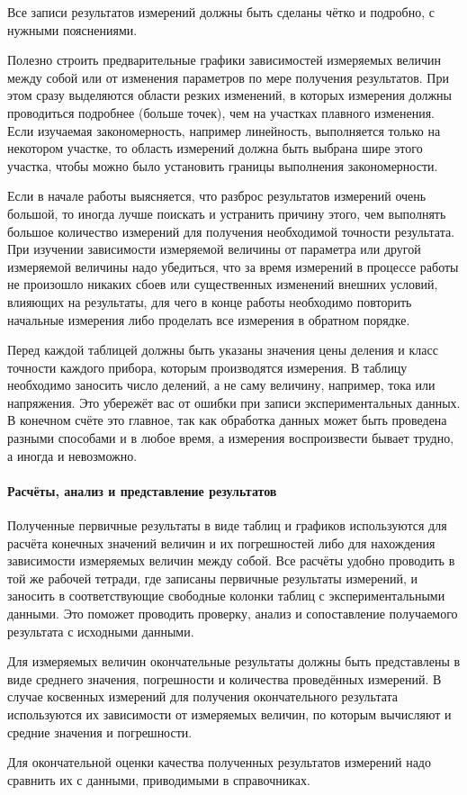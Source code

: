 \documentclass[10pt]{article}
\begin{document}
\begin{lyxgreyedout}
Все записи результатов измерений должны быть сделаны чётко и подробно,
с нужными пояснениями.

Полезно строить предварительные графики зависимостей измеряемых величин
между собой или от изменения параметров по мере получения результатов.
При этом сразу выделяются области резких изменений, в которых измерения
должны проводиться подробнее (больше точек), чем на участках плавного
изменения. Если изучаемая закономерность, например линейность, выполняется
только на некотором участке, то область измерений должна быть выбрана
шире этого участка, чтобы можно было установить границы выполнения
закономерности.

Если в начале работы выясняется, что разброс результатов измерений
очень большой, то иногда лучше поискать и устранить причину этого,
чем выполнять большое количество измерений для получения необходимой
точности результата. При изучении зависимости измеряемой величины
от параметра или другой измеряемой величины надо убедиться, что за
время измерений в процессе работы не произошло никаких сбоев или существенных
изменений внешних условий, влияющих на результаты, для чего в конце
работы необходимо повторить начальные измерения либо проделать все
измерения в обратном порядке.

Перед каждой таблицей должны быть указаны значения цены деления и
класс точности каждого прибора, которым производятся измерения. В
таблицу необходимо заносить число делений, а не саму величину, например,
тока или напряжения. Это убережёт вас от ошибки при записи экспериментальных
данных. В конечном счёте это главное, так как обработка данных может
быть проведена разными способами и в любое время, а измерения воспроизвести
бывает трудно, а иногда и невозможно.%
\end{lyxgreyedout}


\paragraph{Расчёты, анализ и представление результатов}

\begin{lyxgreyedout}
Полученные первичные результаты в виде таблиц и графиков используются
для расчёта конечных значений величин и их погрешностей либо для нахождения
зависимости измеряемых величин между собой. Все расчёты удобно проводить
в той же рабочей тетради, где записаны первичные результаты измерений,
и заносить в соответствующие свободные колонки таблиц с экспериментальными
данными. Это поможет проводить проверку, анализ и сопоставление получаемого
результата с исходными данными.

Для измеряемых величин окончательные результаты должны быть представлены
в виде среднего значения, погрешности и количества проведённых измерений.
В случае косвенных измерений для получения окончательного результата
используются их зависимости от измеряемых величин, по которым вычисляют
и средние значения и погрешности.

Для окончательной оценки качества полученных результатов измерений
надо сравнить их с данными, приводимыми в справочниках.%
\end{lyxgreyedout}
\end{document}
